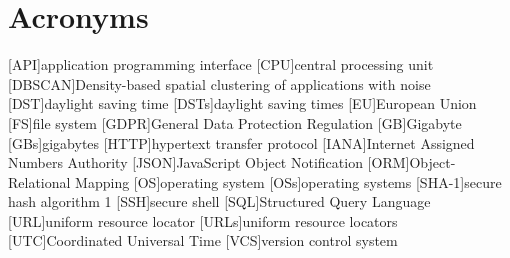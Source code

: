 \chapter*{Acronyms}
\begin{acronym}
    [API]{application programming interface}
    [CPU]{central processing unit}
    [DBSCAN]{Density-based spatial clustering of applications with noise}
    [DST]{daylight saving time}
    [DSTs]{daylight saving times}
    [EU]{European Union}
    [FS]{file system}
    [GDPR]{General Data Protection Regulation}
    [GB]{Gigabyte}
    [GBs]{gigabytes}
    [HTTP]{hypertext transfer protocol}
    [IANA]{Internet Assigned Numbers Authority}
    [JSON]{JavaScript Object Notification}
    [ORM]{Object-Relational Mapping}
    [OS]{operating system}
    [OSs]{operating systems}
    [SHA-1]{secure hash algorithm 1}
    [SSH]{secure shell}
    [SQL]{Structured Query Language}
    [URL]{uniform resource locator}
    [URLs]{uniform resource locators}
    [UTC]{Coordinated Universal Time}
    [VCS]{version control system}
\end{acronym}
